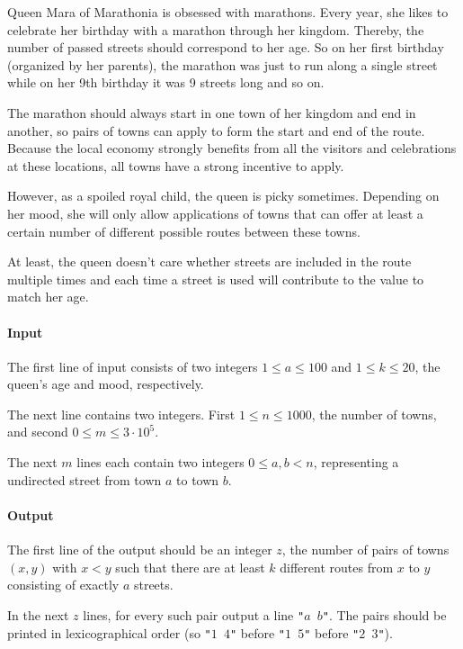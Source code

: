 




Queen Mara of Marathonia is obsessed with marathons. Every year, she likes to celebrate her birthday with a marathon through her kingdom. Thereby, the number of passed streets should correspond to her age. So on her first birthday (organized by her parents), the marathon was just to run along a single street while on her 9th birthday it was 9 streets long and so on.

The marathon should always start in one town of her kingdom and end in another, so pairs of towns can apply to form the start and end of the route. Because the local economy strongly benefits from all the visitors and celebrations at these locations, all towns have a strong incentive to apply.

However, as a spoiled royal child, the queen is picky sometimes. Depending on her mood, she will only allow applications of towns that can offer at least a certain number of different possible routes between these towns.

At least, the queen doesn't care whether streets are included in the route multiple times and each time a street is used will contribute to the value to match her age.

\paragraph*{Input}
The first line of input consists of two integers \(1\le a \le 100\) and \(1\le k \le 20\), the queen's age and mood, respectively.

The next line contains two integers. First \(1 \le n \le 1000\), the number of towns, and second \(0\le m \le 3\cdot 10^5\). 

The next \(m\) lines each contain two integers \(0 \le a,b < n\), representing a undirected street from town \(a\) to town \(b\). 

\paragraph*{Output}
The first line of the output should be an integer \(z\), the number of pairs of towns \((x,y)\) with \(x < y\) such that there are at least \(k\) different routes from \(x\) to \(y\) consisting of exactly \(a\) streets.

In the next \(z\) lines, for every such pair output a line \texttt{"\(a\) \(b\)"}. The pairs should be printed in lexicographical order (so \texttt{"\(1\) \(4\)"} before \texttt{"\(1\) \(5\)"} before \texttt{"\(2\) \(3\)"}).



